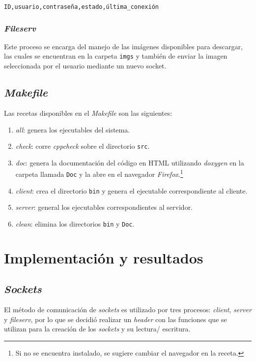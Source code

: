 \documentclass[12pt,a4paper]{article}
\begin{document}
\begin{center}
  \verb|ID,usuario,contraseña,estado,última_conexión|
\end{center}


\subsubsection{\emph{Fileserv}}
\label{files_ps}
Este proceso se encarga del manejo de las imágenes disponibles
para descargar, las cuales se encuentran en la carpeta \verb|imgs|
y también de enviar la imagen seleccionada por el usuario mediante
un nuevo socket.

\subsection{\emph{Makefile}}
\label{make}
Las recetas disponibles en el \emph{Makefile} son las siguientes:

\begin{enumerate}
  \item \emph{all}: genera los ejecutables del sistema.
  \item \emph{check}: corre \emph{cppcheck} sobre el directorio
  \verb|src|.
  \item \emph{doc}: genera la documentación del código en HTML
  utilizando \emph{doxygen} en la carpeta llamada \verb|Doc| y la
  abre en el navegador  \emph{Firefox}.\footnote{Si no se encuentra
  instalado, se sugiere cambiar el navegador en la receta.}
  \item \emph{client}: crea el directorio \verb|bin| y genera el
  ejecutable correspondiente al cliente.
  \item \emph{server}: general los ejecutables correspondientes al
  servidor.
  \item \emph{clean}: elimina los directorios \verb|bin| y
  \verb|Doc|.
\end{enumerate}


\section{Implementación y resultados}
\label{impres}

\subsection{\emph{Sockets}}
El método de comunicación de \emph{sockets} es utilizado por tres
procesos: \emph{client}, \emph{server} y \emph{fileserv}, por lo
que se decidió realizar un \emph{header} con las funciones que se
utilizan para la creación de los \emph{sockets} y su lectura/
escritura.
\end{document}
